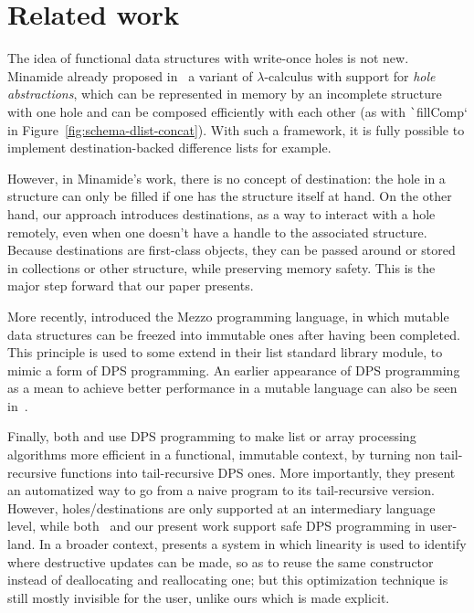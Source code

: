 \documentclass[english]{jflart}
\begin{document}
\section{Related work}

The idea of functional data structures with write-once holes is not new. Minamide already proposed in~\cite{minamide_functional_1998} a variant of $\lambda$-calculus with support for \emph{hole abstractions}, which can be represented in memory by an incomplete structure with one hole and can be composed efficiently with each other (as with \texttt`fillComp` in Figure~\ref{fig:schema-dlist-concat}). With such a framework, it is fully possible to implement destination-backed difference lists for example.

However, in Minamide's work, there is no concept of destination: the hole in a structure can only be filled if one has the structure itself at hand. On the other hand, our approach introduces destinations, as a way to interact with a hole remotely, even when one doesn't have a handle to the associated structure. Because destinations are first-class objects, they can be passed around or stored in collections or other structure, while preserving memory safety. This is the major step forward that our paper presents.

More recently, \cite{protzenko_mezzo_2013} introduced the Mezzo programming language, in which mutable data structures can be freezed into immutable ones after having been completed. This principle is used to some extend in their list standard library module, to mimic a form of DPS programming. An earlier appearance of DPS programming as a mean to achieve better performance in a mutable language can also be seen in~\cite{larus_restructuring_1989}.

Finally, both \cite{shaikhha_destination-passing_2017} and \cite{bour_tmc_2021} use DPS programming to make list or array processing algorithms more efficient in a functional, immutable context, by turning non tail-recursive functions into tail-recursive DPS ones. More importantly, they present an automatized way to go from a naive program to its tail-recursive version. However, holes/destinations are only supported at an intermediary language level, while both~\cite{minamide_functional_1998} and our present work support safe DPS programming in user-land. In a broader context, \cite{lorenzen_fp_2023} presents a system in which linearity is used to identify where destructive updates can be made, so as to reuse the same constructor instead of deallocating and reallocating one; but this optimization technique is still mostly invisible for the user, unlike ours which is made explicit.
\end{document}
